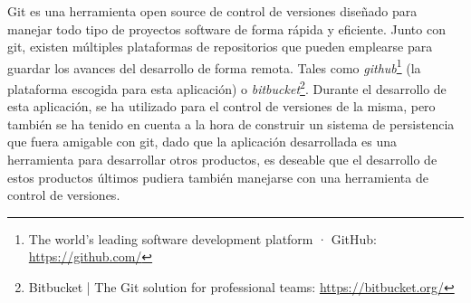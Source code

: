 Git\cite{git} es una herramienta open source de control de versiones diseñado para manejar todo tipo de proyectos software de forma rápida y eficiente.
Junto con git, existen múltiples plataformas de repositorios que pueden emplearse para guardar los avances del desarrollo de forma remota. Tales como \textit{github}\footnote{The world's leading software development platform · GitHub: \url{https://github.com/}} (la plataforma escogida para esta aplicación) o \textit{bitbucket}\footnote{Bitbucket | The Git solution for professional teams: \url{https://bitbucket.org/}}.
Durante el desarrollo de esta aplicación, se ha utilizado para el control de versiones de la misma, pero también se ha tenido en cuenta a la hora de construir un sistema de persistencia que fuera amigable con git, dado que la aplicación desarrollada es una herramienta para desarrollar otros productos, es deseable que el desarrollo de estos productos últimos pudiera también manejarse con una herramienta de control de versiones.
